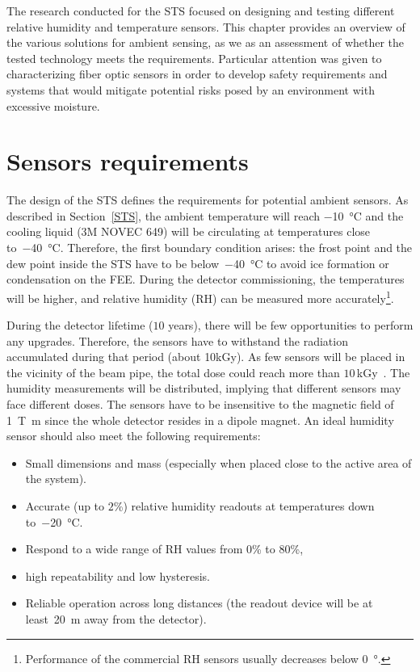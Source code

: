 The research conducted for the \gls{STS} focused on designing and testing different relative humidity and temperature sensors. This chapter provides an overview of the various solutions for ambient sensing, as we as an assessment of whether the tested technology meets the requirements. Particular attention was given to characterizing fiber optic sensors in order to develop safety requirements and systems that would mitigate potential risks posed by an environment with excessive moisture. 


\section{Sensors requirements}

The design of the \gls{STS} \cite{Heuser:54798} defines the requirements for potential ambient sensors. As described in Section~\ref{STS}, the ambient temperature will reach \SI{-10}{\celsius} and the cooling liquid (3M NOVEC 649) will be circulating at temperatures close to~\SI{-40}{\celsius}. Therefore, the first boundary condition arises: the frost point and the dew point inside the \gls{STS} have to be below~\SI{-40}{\celsius} to avoid ice formation or condensation on the \gls{FEE}.
During the detector commissioning, the temperatures will be higher, and relative humidity (\gls{RH}) can be measured more accurately\footnote{Performance of the commercial RH sensors usually decreases below \SI{0}{\degree}.}. 

During the detector lifetime ($10$ years), there will be few opportunities to perform any upgrades. Therefore, the sensors have to withstand the radiation accumulated during that period (about 10kGy). As few sensors will be placed in the vicinity of the beam pipe, the total dose could reach more than $10$\,kGy~\cite{Heuser:54798}. The humidity measurements will be distributed, implying that different sensors may face different doses. 
The sensors have to be insensitive to the magnetic field of \SI{1}{\tesla\metre} since the whole detector resides in a dipole magnet.  An ideal humidity sensor should also meet the following requirements:
\begin{itemize}
    \item Small dimensions and mass (especially when placed close to the active area of the system).
    \item Accurate (up to $2$\%) relative humidity readouts at temperatures down to~\SI{-20}{\celsius}.
    \item Respond to a wide range of \gls{RH} values from $0$\% to $80$\%,
    \item high repeatability and low hysteresis.
    \item Reliable operation across long distances (the readout device will be at least~\SI{20}{\metre} away from the detector).
\end{itemize}

